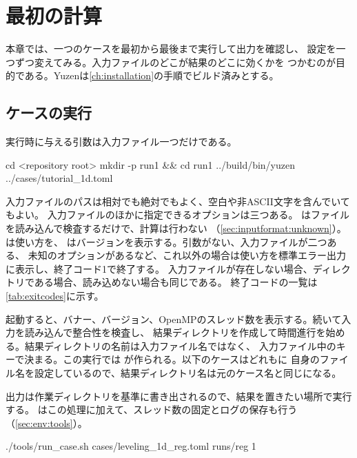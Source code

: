 \chapter{最初の計算}
\label{ch:firstrun}

本章では、一つのケースを最初から最後まで実行して出力を確認し、
設定を一つずつ変えてみる。入力ファイルのどこが結果のどこに効くかを
つかむのが目的である。Yuzenは\cref{ch:installation}の手順でビルド済みとする。

\section{ケースの実行}
\label{sec:firstrun:run}

実行時に与える引数は入力ファイル一つだけである。

\begin{shell}
cd <repository root>
mkdir -p run1 && cd run1
../build/bin/yuzen ../cases/tutorial_1d.toml
\end{shell}

入力ファイルのパスは相対でも絶対でもよく、空白や非ASCII文字を含んでいてもよい。
入力ファイルのほかに指定できるオプションは三つある。
はファイルを読み込んで検査するだけで、計算は行わない
（\cref{sec:inputformat:unknown}）。は使い方を、
はバージョンを表示する。引数がない、入力ファイルが二つある、
未知のオプションがあるなど、これ以外の場合は使い方を標準エラー出力に表示し、終了コード1で終了する。
入力ファイルが存在しない場合、ディレクトリである場合、読み込めない場合も同じである。
終了コードの一覧は\cref{tab:exitcodes}に示す。

起動すると、バナー、バージョン、OpenMPのスレッド数を表示する。続いて入力を読み込んで整合性を検査し、
結果ディレクトリを作成して時間進行を始める。結果ディレクトリの名前は入力ファイル名ではなく、
入力ファイル中のキーで決まる。この実行では
が作られる。以下のケースはどれもに
自身のファイル名を設定しているので、結果ディレクトリ名は元のケース名と同じになる。

\begin{note}[作業用ディレクトリで実行する]
  出力は作業ディレクトリを基準に書き出されるので、結果を置きたい場所で実行する。
  はこの処理に加えて、スレッド数の固定とログの保存も行う
  （\cref{sec:env:tools}）。
  \begin{shell}
./tools/run_case.sh cases/leveling_1d_reg.toml runs/reg 1
  \end{shell}
\end{note}

